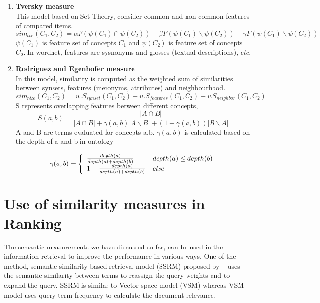 \begin{enumerate}

\item{\textbf{Tversky measure}}\\
This model based on Set Theory, consider common and non-common features of compared items. 
\begin{equation}
sim_{tve}(C_1, C_2) = \alpha F(\psi(C_1) \cap \psi(C_2)) - \beta F(\psi(C_1) \backslash \psi(C_2)) - \gamma F(\psi(C_1) \backslash \psi(C_2))
\end{equation} 
$\psi(C_1)$ is feature set of concepts $C_1$ and $\psi(C_2)$ is feature set of concepts $C_2$. In wordnet, features are sysnonyms and glosses (textual descriptions), \textit{etc}.

\item{\textbf{Rodriguez and Egenhofer measure}}  \\
In this model, similarity is computed as the weighted sum of similarities between synsets, features (meronyms, attributes) and neighbourhood.
\begin{equation}
sim_{r\&e}(C_1, C_2) = w . S_{synset}(C_1,C_2) + u . S_{features}(C_1,C_2) + v . S_{neighbor}(C_1,C_2) 
\end{equation} 
S represents overlapping features between different concepts,
\begin{equation}
S(a, b) = \frac{|A \cap B| }{ |A \cap B| + \gamma(a,b) | A \backslash B | + (1-\gamma(a,b)) | B \backslash A | }
\end{equation} 
A and B are terms evaluated for concepts a,b. $\gamma(a,b)$ is calculated based on the depth of a and b in ontology

	\[\gamma(a,b) = \left\{ 
	\begin{array}{l l}
	  \frac{depth(a)}{depth(a)+depth(b)} & depth(a) \leq depth(b) \\
	  1- \frac{depth(a)}{depth(a)+depth(b)} & else \\ 
	  \end{array} \right. \]



\end{enumerate}



\section{Use of similarity measures in Ranking} 
The semantic measurements we have discussed so far, can be used in the information retrieval to improve the performance in various ways. One of the method, semantic similarity based retrieval model (SSRM) proposed by ~\cite{hliaoutakis2006information} uses the semantic similarity between terms to reassign the query weights and to expand the query. SSRM is similar to Vector space model (VSM) whereas VSM model uses query term frequency to calculate the document relevance. \\

